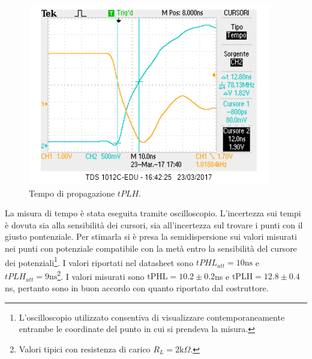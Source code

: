 \documentclass[10pt,a4paper]{article}
\begin{document}
\begin{figure}
\centering
\includegraphics[scale=0.6]{tplh.png}
\caption{Tempo di propagazione $tPLH$.\label{fig:tplh}}
\end{figure}
La misura di tempo è stata eseguita tramite oscilloscopio. L'incertezza sui tempi è dovuta sia alla sensibilità dei cursori, sia all'incertezza sul trovare i punti con il giusto pontenziale. Per stimarla si è presa la semidispersione sui valori misurati nei punti con potenziale compatibile con la metà entro la sensibilità del cursore dei potenziali\footnote{L'oscilloscopio utilizzato consentiva di visualizzare contemporaneamente entrambe le coordinate del punto in cui si prendeva la misura.}.
I valori riportati nel datasheet sono
$tPHL_{att}=10 \mbox{ns}$ e $tPLH_{att}= 9\mbox{ns}$\footnote{Valori tipici con resistenza di carico $R_L = 2\mbox{k}\Omega$.}. 
I valori misurati sono $\mbox{tPHL} = 10.2\pm0.2$ns  e $\mbox{tPLH} = 12.8\pm0.4$ns, pertanto sono in buon accordo con quanto riportato dal costruttore.

\end{document}
